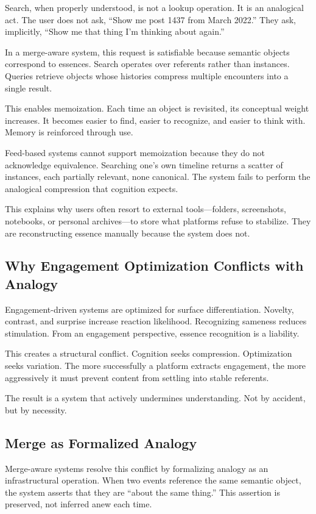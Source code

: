\documentclass[11pt,oneside]{article}
\begin{document}
Search, when properly understood, is not a lookup operation. It is an analogical act. The user does not ask, “Show me post 1437 from March 2022.” They ask, implicitly, “Show me that thing I’m thinking about again.”

In a merge-aware system, this request is satisfiable because semantic objects correspond to essences. Search operates over referents rather than instances. Queries retrieve objects whose histories compress multiple encounters into a single result.

This enables memoization. Each time an object is revisited, its conceptual weight increases. It becomes easier to find, easier to recognize, and easier to think with. Memory is reinforced through use.

Feed-based systems cannot support memoization because they do not acknowledge equivalence. Searching one’s own timeline returns a scatter of instances, each partially relevant, none canonical. The system fails to perform the analogical compression that cognition expects.

This explains why users often resort to external tools—folders, screenshots, notebooks, or personal archives—to store what platforms refuse to stabilize. They are reconstructing essence manually because the system does not.

\subsection{Why Engagement Optimization Conflicts with Analogy}

Engagement-driven systems are optimized for surface differentiation. Novelty, contrast, and surprise increase reaction likelihood. Recognizing sameness reduces stimulation. From an engagement perspective, essence recognition is a liability.

This creates a structural conflict. Cognition seeks compression. Optimization seeks variation. The more successfully a platform extracts engagement, the more aggressively it must prevent content from settling into stable referents.

The result is a system that actively undermines understanding. Not by accident, but by necessity.

\subsection{Merge as Formalized Analogy}

Merge-aware systems resolve this conflict by formalizing analogy as an infrastructural operation. When two events reference the same semantic object, the system asserts that they are “about the same thing.” This assertion is preserved, not inferred anew each time.
\end{document}

